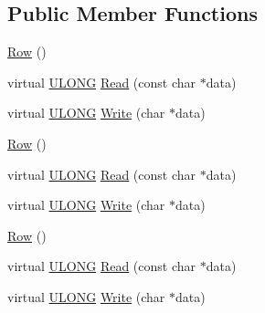 \subsection*{Public Member Functions}
\begin{DoxyCompactItemize}
\item 
\hyperlink{struct_y_excel_1_1_worksheet_1_1_cell_table_1_1_row_block_1_1_row_a9bf5c9099c96ee22982be66608d7db76}{Row} ()
\item 
virtual \hyperlink{_basic_excel_8hpp_abe09d1bea023be6a07cbadde8e955435}{U\+L\+O\+N\+G} \hyperlink{struct_y_excel_1_1_worksheet_1_1_cell_table_1_1_row_block_1_1_row_a17c5d497d1b259ec3369b03c4e5384c7}{Read} (const char $\ast$data)
\item 
virtual \hyperlink{_basic_excel_8hpp_abe09d1bea023be6a07cbadde8e955435}{U\+L\+O\+N\+G} \hyperlink{struct_y_excel_1_1_worksheet_1_1_cell_table_1_1_row_block_1_1_row_a6226434b10d293ad2d3e0312c51f3cb9}{Write} (char $\ast$data)
\item 
\hyperlink{struct_y_excel_1_1_worksheet_1_1_cell_table_1_1_row_block_1_1_row_a9bf5c9099c96ee22982be66608d7db76}{Row} ()
\item 
virtual \hyperlink{_basic_excel_8hpp_abe09d1bea023be6a07cbadde8e955435}{U\+L\+O\+N\+G} \hyperlink{struct_y_excel_1_1_worksheet_1_1_cell_table_1_1_row_block_1_1_row_aec347d79703fac121accc88b0dbfe6b3}{Read} (const char $\ast$data)
\item 
virtual \hyperlink{_basic_excel_8hpp_abe09d1bea023be6a07cbadde8e955435}{U\+L\+O\+N\+G} \hyperlink{struct_y_excel_1_1_worksheet_1_1_cell_table_1_1_row_block_1_1_row_a17bace15262ca640ba287ce8f633dca8}{Write} (char $\ast$data)
\item 
\hyperlink{struct_y_excel_1_1_worksheet_1_1_cell_table_1_1_row_block_1_1_row_a9bf5c9099c96ee22982be66608d7db76}{Row} ()
\item 
virtual \hyperlink{_basic_excel_8hpp_abe09d1bea023be6a07cbadde8e955435}{U\+L\+O\+N\+G} \hyperlink{struct_y_excel_1_1_worksheet_1_1_cell_table_1_1_row_block_1_1_row_aec347d79703fac121accc88b0dbfe6b3}{Read} (const char $\ast$data)
\item 
virtual \hyperlink{_basic_excel_8hpp_abe09d1bea023be6a07cbadde8e955435}{U\+L\+O\+N\+G} \hyperlink{struct_y_excel_1_1_worksheet_1_1_cell_table_1_1_row_block_1_1_row_a17bace15262ca640ba287ce8f633dca8}{Write} (char $\ast$data)
\end{DoxyCompactItemize}

